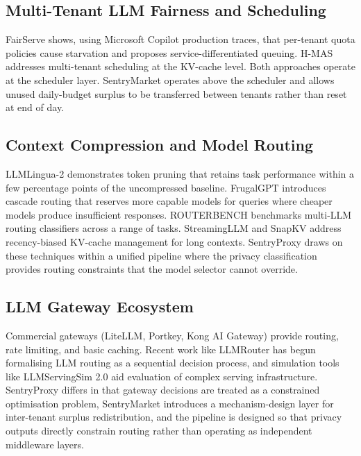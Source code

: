 \documentclass[conference]{IEEEtran}
\begin{document}
\subsection{Multi-Tenant LLM Fairness and Scheduling}
FairServe \cite{b_fairserve} shows, using Microsoft Copilot production traces, that per-tenant quota policies cause starvation and proposes service-differentiated queuing. H-MAS \cite{b_hmas} addresses multi-tenant scheduling at the KV-cache level. Both approaches operate at the scheduler layer. SentryMarket operates above the scheduler and allows unused daily-budget surplus to be transferred between tenants rather than reset at end of day.

\subsection{Context Compression and Model Routing}
LLMLingua-2 \cite{b_llmlingua} demonstrates token pruning that retains task performance within a few percentage points of the uncompressed baseline. FrugalGPT \cite{b_frugalgpt} introduces cascade routing that reserves more capable models for queries where cheaper models produce insufficient responses. ROUTERBENCH \cite{b_routerbench} benchmarks multi-LLM routing classifiers across a range of tasks. StreamingLLM \cite{b_streamingllm} and SnapKV \cite{b_snapkv} address recency-biased KV-cache management for long contexts. SentryProxy draws on these techniques within a unified pipeline where the privacy classification provides routing constraints that the model selector cannot override.

\subsection{LLM Gateway Ecosystem}
Commercial gateways (LiteLLM, Portkey, Kong AI Gateway) provide routing, rate limiting, and basic caching. Recent work like LLMRouter \cite{b_llmrouter_2026} has begun formalising LLM routing as a sequential decision process, and simulation tools like LLMServingSim 2.0 \cite{b_llmsim_2026} aid evaluation of complex serving infrastructure. SentryProxy differs in that gateway decisions are treated as a constrained optimisation problem, SentryMarket introduces a mechanism-design layer for inter-tenant surplus redistribution, and the pipeline is designed so that privacy outputs directly constrain routing rather than operating as independent middleware layers.

\end{document}
